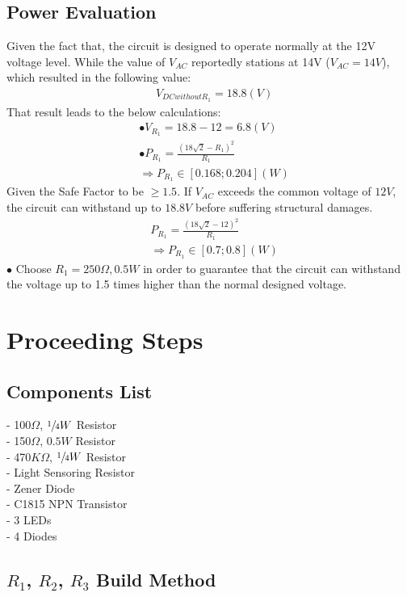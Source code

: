 \documentclass[12pt]{extarticle}
\newcommand{\<}{\langle}
\newcommand\tab[1][1cm]{\hspace*{#1}}
\renewcommand{\>}{\rangle}
\theoremstyle{definition}
\begin{document}
\begin{normalsize}
\subsection{Power Evaluation}
Given the fact that, the circuit is designed to operate normally at the 12V voltage level. While the value of $V_{AC}$ reportedly stations at 14V ($V_{AC} = 14V$), which resulted in the following value:
\begin{align*}
&V_{DC without R_1} =  18.8(V)
\end{align*}
That result leads to the below calculations:
\begin{align*}
&\bullet V_{R_1} = 18.8 - 12 = 6.8(V)\\
&\bullet P_{R_1} = \frac{(18\sqrt{2} - R_1)^2}{R_1}\\
&\Longrightarrow P_{R_1} \in [0.168 ; 0.204](W)
\end{align*}
Given the Safe Factor to be $\geq 1.5$. If $V_{AC}$ exceeds the common voltage of $12V$, the circuit can withstand up to $18.8V$ before suffering structural damages.
\begin{align*}
&P_{R_1} = \frac{(18\sqrt{2} - 12)^2}{R_1}\\
&\Longrightarrow P_{R_1} \in [0.7 ; 0.8](W)
\end{align*}
$\bullet$ Choose $R_1 = 250\Omega, 0.5W$ in order to guarantee that the circuit can withstand the voltage up to 1.5 times higher than the normal designed voltage.
\section{Proceeding Steps}
\subsection{Components List} 
\tab - 100$\Omega$, $\sfrac{1}{4}W$ Resistor\\
\tab - 150$\Omega$, $0.5W$ Resistor\\
\tab - 470$K\Omega$, $\sfrac{1}{4}W$ Resistor\\
\tab - Light Sensoring Resistor\\
\tab - Zener Diode\\
\tab - C1815 NPN Transistor\\
\tab - 3 LEDs\\
\tab - 4 Diodes
\subsection{$R_1$, $R_2$, $R_3$ Build Method} 

\end{normalsize}
\end{document}
